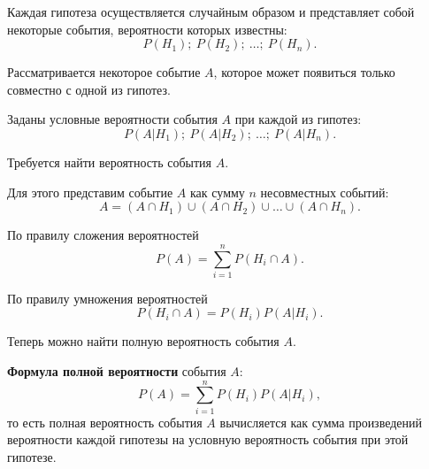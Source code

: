 \documentclass[a4paper]{article}
\newcommand{\key}[1]{{\bfseries\color{Medium} #1}}
\begin{document}
                Каждая гипотеза осуществляется случайным образом и представляет собой некоторые события, вероятности которых известны:
                \begin{equation*}
                    P(H_1) ; \: P(H_2) ; \: \ldots ; \: P(H_n) .
                \end{equation*}

                Рассматривается некоторое событие $A$, которое может появиться только совместно с одной из гипотез.
                
                Заданы условные вероятности события $A$ при каждой из гипотез:
                \begin{equation*}
                    P(A | H_1) ; \: P(A | H_2) ; \: \ldots ; \: P(A | H_n) .
                \end{equation*}

                Требуется найти вероятность события $A$.
                
                Для этого представим событие $A$ как сумму $n$ несовместных событий:
                \begin{equation*}
                    A = (A \cap H_1) \cup (A \cap H_2) \cup \ldots \cup (A \cap H_n) .
                \end{equation*}

                По правилу сложения вероятностей
                \begin{equation*}
                    P(A) = \sum\limits_{i = 1}^{n} P(H_i \cap A) .
                \end{equation*}

                По правилу умножения вероятностей
                \begin{equation*}
                    P(H_i \cap A) = P(H_i) P(A | H_i) .
                \end{equation*}

                Теперь можно найти полную вероятность события $A$.

                \key{Формула полной вероятности} события $A$:
                \begin{equation*}
                    P(A) = \sum\limits_{i = 1}^{n} P(H_i) P(A | H_i) ,
                \end{equation*}
                то есть полная вероятность события $A$ вычисляется как сумма произведений вероятности каждой гипотезы на условную вероятность события при этой гипотезе.
\end{document}
